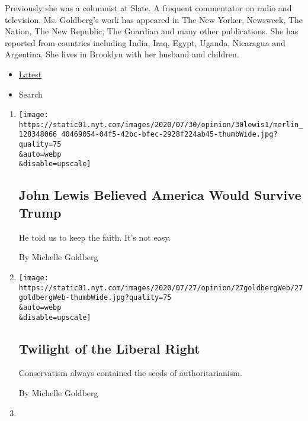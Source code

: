 Previously she was a columnist at Slate. A frequent commentator on radio
and television, Ms. Goldberg's work has appeared in The New Yorker,
Newsweek, The Nation, The New Republic, The Guardian and many other
publications. She has reported from countries including India, Iraq,
Egypt, Uganda, Nicaragua and Argentina. She lives in Brooklyn with her
husband and children. ~

\begin{itemize}
\tightlist
\item
  \protect\hyperlink{stream-panel}{Latest}
\item
  Search
\end{itemize}

\begin{enumerate}
\def\labelenumi{\arabic{enumi}.}
\item
  \href{/2020/07/30/opinion/john-lewis-legacy.html}{}

  \texttt{[image: https://static01.nyt.com/images/2020/07/30/opinion/30lewis1/merlin\_128348066\_40469054-04f5-42bc-bfec-2928f224ab45-thumbWide.jpg?quality=75\\\&auto=webp\\\&disable=upscale]}

  \hypertarget{john-lewis-believed-america-would-survive-trump}{%
  \subsection{John Lewis Believed America Would Survive
  Trump}\label{john-lewis-believed-america-would-survive-trump}}

  He told us to keep the faith. It's not easy.

  By Michelle Goldberg
\item
  \href{/2020/07/27/opinion/anne-applebaum-twilight-of-democracy.html}{}

  \texttt{[image: https://static01.nyt.com/images/2020/07/27/opinion/27goldbergWeb/27goldbergWeb-thumbWide.jpg?quality=75\\\&auto=webp\\\&disable=upscale]}

  \hypertarget{twilight-of-the-liberal-right}{%
  \subsection{Twilight of the Liberal
  Right}\label{twilight-of-the-liberal-right}}

  Conservatism always contained the seeds of authoritarianism.

  By Michelle Goldberg
\item
  \href{/2020/07/20/opinion/portland-protests-trump.html}{}


\end{enumerate}
